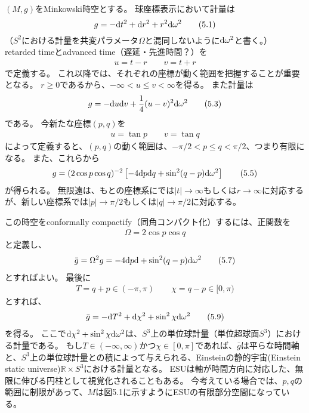 \documentclass[a4paper, 12pt]{jsarticle}
\newcommand{\ddif}{{\rm d}}
\begin{document}
$(M, g)$をMinkowski時空とする。
球座標表示において計量は
\begin{equation}
	g = -\ddif t^2 + \ddif r^2 + r^2 \ddif \omega^2 \tag{5.1}
\end{equation}
（$S^2$における計量を共変パラメータ$\Omega$と混同しないように$\ddif \omega^2$と書く。）
retarded timeとadvanced time（遅延・先進時間？）を
\begin{align}
	u = t - r \qquad v=t+r \tag{5.2}
\end{align}
で定義する。
これ以降では、それぞれの座標が動く範囲を把握することが重要となる。
$r \ge 0$であるから、$-\infty < u \le v < \infty$を得る。
また計量は
\begin{align}
	g = -\ddif u \ddif v + \frac{1}{4} (u-v)^2 \ddif \omega^2 \tag{5.3}
\end{align}
である。
今新たな座標$(p, q)$を
\begin{align}
	u = \tan p \qquad v = \tan q \tag{5.4}
\end{align}
によって定義すると、$(p, q)$の動く範囲は、$-\pi/2 < p \le q < \pi/2$、つまり有限になる。
また、これらから
\begin{align}
	g = (2 \cos p \cos q)^{-2} \left[ -4\ddif p \ddif q + \sin^2 (q-p) \ddif \omega^2 \right] \tag{5.5}
\end{align}
が得られる。
無限遠は、もとの座標系にでは$|t| \to \infty$もしくは$r \to \infty$に対応するが、新しい座標系では$|p| \to \pi/2$もしくは$|q| \to \pi/2$に対応する。

この時空をconformally compactify（同角コンパクト化）するには、正関数を
\begin{align}
	\Omega = 2 \cos p \cos q \tag{5.6}
\end{align}
と定義し、
\begin{align}
	\bar{g} = \Omega^2 g = -4 \ddif p \ddif + \sin^2 (q-p) \ddif \omega^2 \tag{5.7}
\end{align}
とすればよい。
最後に
\begin{align}
	T = q + p \in (-\pi, \pi) \qquad \chi = q - p \in [0, \pi) \tag{5.8}
\end{align}
とすれば、
\begin{align}
	\bar{g} = - \ddif T^2 + \ddif \chi^2 + \sin^2 \chi \ddif \omega^2 \tag{5.9}
\end{align}
を得る。
ここで$\ddif \chi^2 + \sin^2 \chi \ddif \omega^2$は、$S^3$上の単位球計量（単位超球面$S^3$）における計量である。
もし$T \in (-\infty, \infty)$かつ$\chi \in [0, \pi]$であれば、$\bar{g}$は平らな時間軸と、$S^3$上の単位球計量との積によって与えられる、Einsteinの静的宇宙(Einstein static universe)$\mathbb{R} \times S^3$における計量となる。
ESUは軸が時間方向に対応した、無限に伸びる円柱として視覚化されることもある。
今考えている場合では、$p, q$の範囲に制限があって、$M$は図5.1に示すようにESUの有限部分空間になっている。
\end{document}
